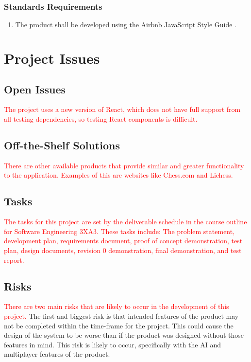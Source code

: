 \documentclass[12pt, titlepage]{article}
\begin{document}
    \subsubsection{Standards Requirements}
    \begin{enumerate}[{LR}1., leftmargin=2\parindent]
    	\item The product shall be developed using the Airbnb JavaScript Style Guide \cite{AirbnbStyle}.
    \end{enumerate}

\section{Project Issues}

    \subsection{Open Issues}
        \textcolor{red}{The project uses a new version of React, which does not have full support from all testing dependencies, so testing React components is difficult.}
        
    \subsection{Off-the-Shelf Solutions}
        \textcolor{red}{There are other available products that provide similar and greater functionality to the application. Examples of this are websites like Chess.com and Lichess.}
        
    \subsection{Tasks}
        \textcolor{red}{The tasks for this project are set by the deliverable schedule in the course outline for Software Engineering 3XA3. These tasks include: The problem statement, development plan, requirements document, proof of concept demonstration, test plan, design documents, revision 0 demonstration, final demonstration, and test report.}

    \subsection{Risks}
        \textcolor{red}{There are two main risks that are likely to occur in the development of this project.} The first and biggest risk is that intended features of the product may not be completed within the time-frame for the project. This could cause the design of the system to be worse than if the product was designed without those features in mind. This risk is likely to occur, specifically with the AI and multiplayer features of the product.\\
        
\end{document}
